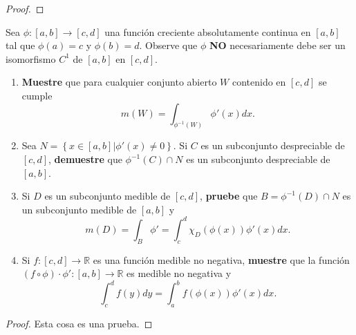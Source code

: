 \documentclass[12pt]{report}
\theoremstyle{largebreak}
\newcommand\cf[3]{\ensuremath{#1:#2\rightarrow#3}}
\begin{document}
    \begin{proof}
        
    \end{proof}

    \begin{excer}
        Sea $\cf{\phi}{[a,b]}{[c,d]}$ una función creciente absolutamente continua en $[a,b]$ tal que $\phi(a)=c$ y $\phi(b)=d$. Observe que $\phi$ \textbf{NO} necesariamente debe ser un isomorfismo $C^1$ de $[a,b]$ en $[c,d]$.
        \begin{enumerate}
            \item \textbf{Muestre} que para cualquier conjunto abierto $W$ contenido en $[c,d]$ se cumple
            \begin{equation*}
                m(W)=\int_{\phi^{-1}(W)}\phi'(x)dx.
            \end{equation*}
            \item Sea $N=\left\{x\in[a,b]|\phi'(x)\neq0\right\}$. Si $C$ es un subconjunto despreciable de $[c,d]$, \textbf{demuestre} que $\phi^{-1}(C)\cap N$ es un subconjunto despreciable de $[a,b]$.
            \item Si $D$ es un subconjunto medible de $[c,d]$, \textbf{pruebe} que $B=\phi^{-1}(D)\cap N$ es un subconjunto medible de $[a,b]$ y
            \begin{equation*}
                m(D)=\int_{B}\phi'=\int_{c}^{d}\chi_D(\phi(x))\phi'(x)dx.
            \end{equation*}
            \item Si $\cf{f}{[c,d]}{\mathbb{R}}$ es una función medible no negativa, \textbf{muestre} que la función $\cf{(f\circ\phi)\cdot\phi'}{[a,b]}{\mathbb{R}}$ es medible no negativa y
            \begin{equation*}
                \int_{c}^{d}f(y)dy=\int_{a}^{b}f(\phi(x))\phi'(x)dx.
            \end{equation*}
        \end{enumerate}
    \end{excer}

    \begin{proof}
        Esta cosa es una prueba.
    \end{proof}
    
\end{document}
